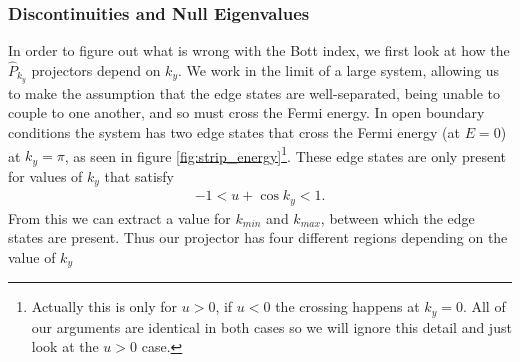 \subsubsection{Discontinuities and Null Eigenvalues} \label{sec:discontinuities_example}
In order to figure out what is wrong with the Bott index, we first look at how the $\hat P_{k_y}$ projectors depend on $k_y$. We work in the limit of a large system, allowing us to make the assumption that the edge states are well-separated, being unable to couple to one another, and so must cross the Fermi energy. In open boundary conditions the system has two edge states that cross the Fermi energy (at $E = 0$) at $k_y = \pi$, as seen in figure \ref{fig:strip_energy}\footnote{Actually this is only for $u>0$, if $u<0$ the crossing happens at $k_y = 0$. All of our arguments are identical in both cases so we will ignore this detail and just look at the $u>0$ case.}. These edge states are only present for values of $k_y$ that satisfy
\begin{align}
	-1 < u+\cos k_y < 1.
\end{align}
From this we can extract a value for $k_{min}$ and $k_{max}$, between which the edge states are present. Thus our projector has four different regions depending on the value of $k_y$
\begin{center}
\end{center}
